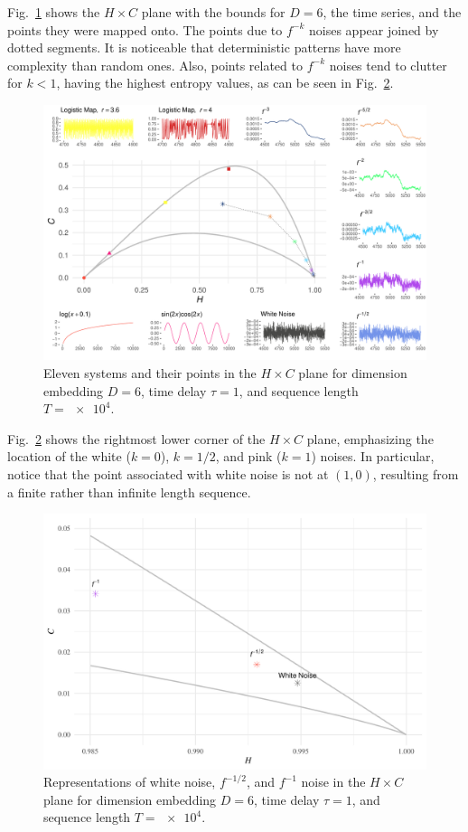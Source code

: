 \documentclass[alpha-refs]{wiley-article}
\begin{document}
Fig.~\ref{fig:AllSystems} shows the $H\times C$ plane with the bounds for $D=6$, the time series, and the points they were mapped onto.
The points due to $f^{-k}$ noises appear joined by dotted segments.
It is noticeable that deterministic patterns have more complexity than random ones.
Also, points related to $f^{-k}$ noises tend to clutter for $k<1$, having the highest entropy values, as can be seen in Fig.~\ref{fig:RightMostCorner}.

\begin{figure}[hbt]
\centering
\includegraphics[width=\linewidth]{AllSystems}
\caption{Eleven systems and their points in the $H\times C$ plane for dimension embedding $D = 6$, time delay $\tau = 1$, and sequence length $T = \num[scientific-notation=true]{e4}$.}
\label{fig:AllSystems}
\end{figure}

Fig.~\ref{fig:RightMostCorner} shows the rightmost lower corner of the $H\times C$ plane, emphasizing the location of the white ($k=0$), $k=1/2$, and pink ($k=1$) noises.
In particular, notice that the point associated with white noise is not at $(1,0)$, resulting from a finite rather than infinite length sequence.

\begin{figure}[hbt]
\centering
\includegraphics[width=\linewidth]{RightMostCorner}
\caption{Representations of white noise, $f^{-1/2}$, and $f^{-1}$ noise in the $H \times C$ plane  for dimension embedding $D = 6$, time delay $\tau = 1$, and sequence length $T = \num[scientific-notation=true]{e4}$.}
\label{fig:RightMostCorner}
\end{figure}
\end{document}
